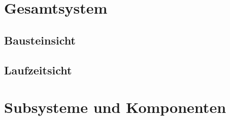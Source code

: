 \documentclass{article}
\begin{document}
\section{Gesamtsystem}

\subsection{Bausteinsicht}

\subsection{Laufzeitsicht}

\newpage

\section{Subsysteme und Komponenten}
\end{document}
